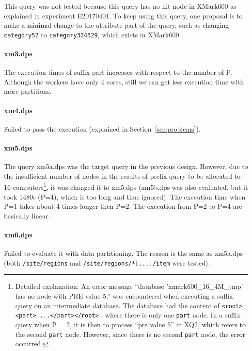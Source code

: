 This query was not tested because this query has no hit node in
XMark600 as explained in experiment E20170401. To keep using this query, one
proposal is to make a minimal change to the attribute part of the query, such as
changing \texttt{category52} to \texttt{category324329}, which exists in
XMark600.


\paragraph{xm3.dps}

The execution times of suffix part increases with respect to the number of P.
Although the workers have only 4 cores, still we can get less execution time
with more partitions. 


\paragraph{xm4.dps}

Failed to pass the execution (explained in Section~\ref{sec:problems}).

\paragraph{xm5.dps}

The query xm5a.dps was the target query in the previous design.
However, due to the insufficient number of nodes in the results of prefix
query to be allocated to 16 computers\footnote{
	Detailed explanation: An error message
	``database 'xmark600\_16\_4M\_tmp' has no node with PRE value 5.'' was
	encountered when executing a suffix query on an intermediate database.
	The database had the content of  \texttt{<root><part> ...</part></root>} ,
	where there is only one \texttt{part} node.
	In a suffix query when P = 2, it is then to process ``pre value 5'' in XQ2,
	which refers to the second \texttt{part} node. However, since there is
	no second \texttt{part} node, the error occurred.
}, it was changed it to xm5.dps (xm5b.dps was also evaluated, but
it took 1480s (P=4), which is too long and thus ignored).
The execution time when P=1 takes about 4 times longer then P=2. The 
execution from P=2 to P=4 are basically linear. 


\paragraph{xm6.dps}

Failed to evaluate it with data partitioning. The reason is
the same as xm5a.dps (both \texttt{/site/regions} and
\texttt{/site/regions/*[...]/item} were tested).

